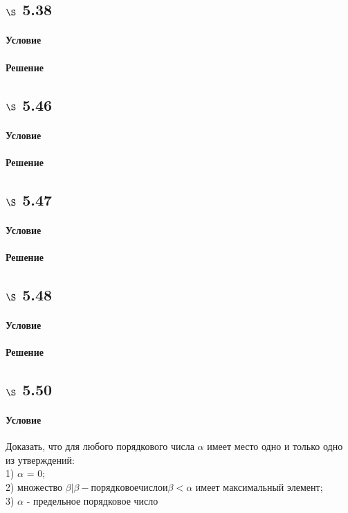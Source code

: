 \documentclass[a4paper,12pt]{article}
\begin{document}
\subsection*{$\S$ 5.38}
\paragraph*{Условие}
\paragraph*{Решение}

\subsection*{$\S$ 5.46}
\paragraph*{Условие}
\paragraph*{Решение}

\subsection*{$\S$ 5.47}
\paragraph*{Условие}
\paragraph*{Решение}

\subsection*{$\S$ 5.48}
\paragraph*{Условие}
\paragraph*{Решение}

\subsection*{$\S$ 5.50}
\paragraph*{Условие}
Доказать, что для любого порядкового числа $\alpha$ имеет место одно и только одно из утверждений:\\
1) $\alpha$ = 0;\\
2)  множество {$\beta | \beta - порядковое число и \beta<\alpha$} имеет максимальный элемент;\\
3) $\alpha$ - предельное порядковое число
\end{document}
